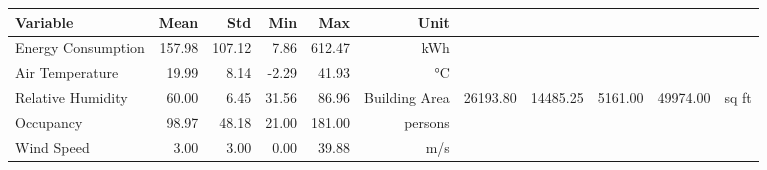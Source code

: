 \begin{tabular}{lrrrrr}
\toprule
Variable & Mean & Std & Min & Max & Unit \\
\midrule
Energy Consumption & 157.98 & 107.12 & 7.86 & 612.47 & kWh \\
Air Temperature & 19.99 & 8.14 & -2.29 & 41.93 & °C \\
Relative Humidity & 60.00 & 6.45 & 31.56 & 86.96 & %
Building Area & 26193.80 & 14485.25 & 5161.00 & 49974.00 & sq ft \\
Occupancy & 98.97 & 48.18 & 21.00 & 181.00 & persons \\
Wind Speed & 3.00 & 3.00 & 0.00 & 39.88 & m/s \\
\bottomrule
\end{tabular}
